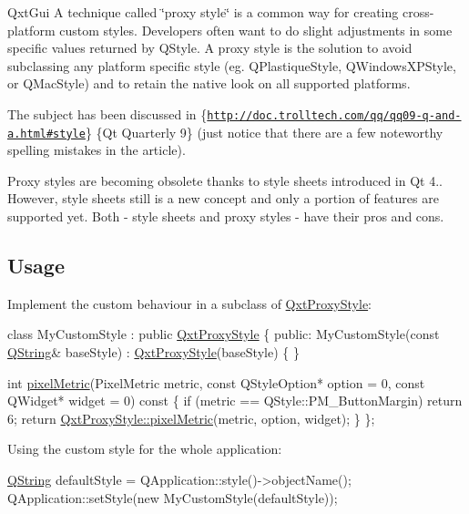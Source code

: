 Qxt\-Gui A technique called \char`\"{}proxy style\char`\"{} is a common way for creating cross-\/platform custom styles. Developers often want to do slight adjustments in some specific values returned by Q\-Style. A proxy style is the solution to avoid subclassing any platform specific style (eg. Q\-Plastique\-Style, Q\-Windows\-X\-P\-Style, or Q\-Mac\-Style) and to retain the native look on all supported platforms.

The subject has been discussed in  \{\href{http://doc.trolltech.com/qq/qq09-q-and-a.html#style}{\tt http\-://doc.\-trolltech.\-com/qq/qq09-\/q-\/and-\/a.\-html\#style}\} \{Qt Quarterly 9\} (just notice that there are a few noteworthy spelling mistakes in the article).

Proxy styles are becoming obsolete thanks to style sheets introduced in Qt 4.. However, style sheets still is a new concept and only a portion of features are supported yet. Both -\/ style sheets and proxy styles -\/ have their pros and cons.\hypertarget{class_qxt_proxy_style_Usage}{}\subsection{Usage}\label{class_qxt_proxy_style_Usage}
Implement the custom behaviour in a subclass of \hyperlink{class_qxt_proxy_style}{Qxt\-Proxy\-Style}\-: 
\begin{DoxyCode}
\textcolor{keyword}{class }MyCustomStyle : \textcolor{keyword}{public} \hyperlink{class_qxt_proxy_style}{QxtProxyStyle}
\{
   \textcolor{keyword}{public}:
      MyCustomStyle(\textcolor{keyword}{const} \hyperlink{group___u_a_v_objects_plugin_gab9d252f49c333c94a72f97ce3105a32d}{QString}& baseStyle) : \hyperlink{class_qxt_proxy_style}{QxtProxyStyle}(baseStyle)
      \{
      \}

      \textcolor{keywordtype}{int} \hyperlink{class_qxt_proxy_style_a14fd21c337d2406c05338b43bc59e9b7}{pixelMetric}(PixelMetric metric, \textcolor{keyword}{const} QStyleOption* option = 0, \textcolor{keyword}{const} QWidget* widget 
      = 0)\textcolor{keyword}{ const}
\textcolor{keyword}{      }\{
         \textcolor{keywordflow}{if} (metric == QStyle::PM\_ButtonMargin)
            \textcolor{keywordflow}{return} 6;
         \textcolor{keywordflow}{return} \hyperlink{class_qxt_proxy_style_a14fd21c337d2406c05338b43bc59e9b7}{QxtProxyStyle::pixelMetric}(metric, option, widget);
      \}
\};
\end{DoxyCode}


Using the custom style for the whole application\-: 
\begin{DoxyCode}
\hyperlink{group___u_a_v_objects_plugin_gab9d252f49c333c94a72f97ce3105a32d}{QString} defaultStyle = QApplication::style()->objectName();
QApplication::setStyle(\textcolor{keyword}{new} MyCustomStyle(defaultStyle));
\end{DoxyCode}


